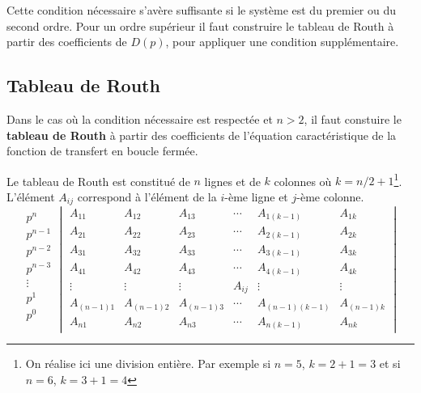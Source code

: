 Cette condition nécessaire s'avère suffisante si le système est du 
premier ou du second ordre. Pour un ordre supérieur il faut construire le 
tableau de Routh à partir des coefficients de $D(p)$,
pour appliquer une condition supplémentaire. 

\subsection{Tableau de Routh}
Dans le cas où la condition nécessaire est respectée et $n>2$, il faut 
constuire le \textbf{tableau de Routh} à partir des coefficients de l'équation 
caractéristique de la fonction de transfert en boucle fermée.

Le tableau de Routh est constitué de $n$ lignes et de $k$ colonnes 
où $k=n/2+1$\footnote{On réalise ici une division entière. Par exemple 
si $n=5$, $k=2+1=3$ et si $n=6$, $k=3+1=4$}. L'élément $A_{ij}$ correspond 
à l'élément de la $i$-ème ligne et $j$-ème colonne.
\[
\begin{matrix}
    p^n    \\
    p^{n-1}\\
    p^{n-2}\\
    p^{n-3}\\
    \vdots \\
    p^1    \\
    p^0    \\
\end{matrix}
\begin{vmatrix}
  A_{11}     & A_{12}     & A_{13}     & \cdots & A_{1(k-1)}     & A_{1k}  \\
  A_{21}     & A_{22}     & A_{23}     & \cdots & A_{2(k-1)}     & A_{2k}  \\
  A_{31}     & A_{32}     & A_{33}     & \cdots & A_{3(k-1)}     & A_{3k}  \\
  A_{41}     & A_{42}     & A_{43}     & \cdots & A_{4(k-1)}     & A_{4k}  \\
  \vdots     & \vdots     & \vdots     & A_{ij} & \vdots         & \vdots  \\
  A_{(n-1)1} & A_{(n-1)2} & A_{(n-1)3} & \cdots & A_{(n-1)(k-1)} & A_{(n-1)k}\\
  A_{n1}     & A_{n2}     & A_{n3}     & \cdots & A_{n(k-1)}     & A_{nk}
\end{vmatrix}
\]

